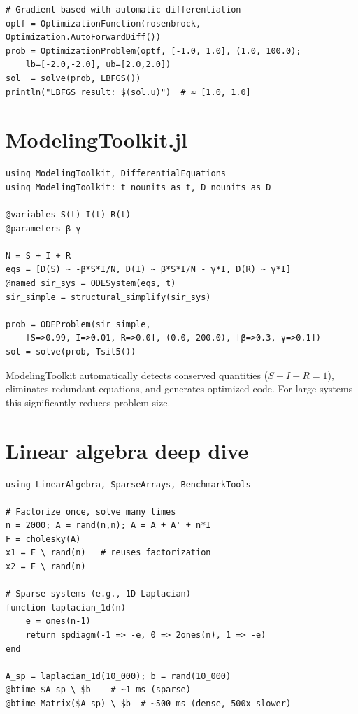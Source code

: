 \begin{verbatim}
# Gradient-based with automatic differentiation
optf = OptimizationFunction(rosenbrock, Optimization.AutoForwardDiff())
prob = OptimizationProblem(optf, [-1.0, 1.0], (1.0, 100.0);
    lb=[-2.0,-2.0], ub=[2.0,2.0])
sol  = solve(prob, LBFGS())
println("LBFGS result: $(sol.u)")  # ≈ [1.0, 1.0]
\end{verbatim}

\section{ModelingToolkit.jl}

\begin{verbatim}
using ModelingToolkit, DifferentialEquations
using ModelingToolkit: t_nounits as t, D_nounits as D

@variables S(t) I(t) R(t)
@parameters β γ

N = S + I + R
eqs = [D(S) ~ -β*S*I/N, D(I) ~ β*S*I/N - γ*I, D(R) ~ γ*I]
@named sir_sys = ODESystem(eqs, t)
sir_simple = structural_simplify(sir_sys)

prob = ODEProblem(sir_simple,
    [S=>0.99, I=>0.01, R=>0.0], (0.0, 200.0), [β=>0.3, γ=>0.1])
sol = solve(prob, Tsit5())
\end{verbatim}

\begin{juliatip}
ModelingToolkit automatically detects conserved quantities ($S+I+R=1$), eliminates redundant equations, and generates optimized code. For large systems this significantly reduces problem size.
\end{juliatip}

\section{Linear algebra deep dive}

\begin{verbatim}
using LinearAlgebra, SparseArrays, BenchmarkTools

# Factorize once, solve many times
n = 2000; A = rand(n,n); A = A + A' + n*I
F = cholesky(A)
x1 = F \ rand(n)   # reuses factorization
x2 = F \ rand(n)

# Sparse systems (e.g., 1D Laplacian)
function laplacian_1d(n)
    e = ones(n-1)
    return spdiagm(-1 => -e, 0 => 2ones(n), 1 => -e)
end

A_sp = laplacian_1d(10_000); b = rand(10_000)
@btime $A_sp \ $b    # ~1 ms (sparse)
@btime Matrix($A_sp) \ $b  # ~500 ms (dense, 500x slower)
\end{verbatim}

